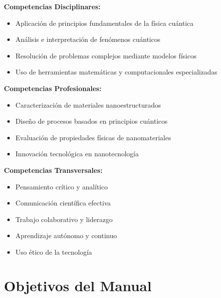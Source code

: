 \documentclass[12pt,a4paper]{book}
\begin{document}
	\begin{competenciabox}
		\textbf{Competencias Disciplinares:}
		\begin{itemize}
			\item Aplicación de principios fundamentales de la física cuántica
			\item Análisis e interpretación de fenómenos cuánticos
			\item Resolución de problemas complejos mediante modelos físicos
			\item Uso de herramientas matemáticas y computacionales especializadas
		\end{itemize}
		
		\textbf{Competencias Profesionales:}
		\begin{itemize}
			\item Caracterización de materiales nanoestructurados
			\item Diseño de procesos basados en principios cuánticos
			\item Evaluación de propiedades físicas de nanomateriales
			\item Innovación tecnológica en nanotecnología
		\end{itemize}
		
		\textbf{Competencias Transversales:}
		\begin{itemize}
			\item Pensamiento crítico y analítico
			\item Comunicación científica efectiva
			\item Trabajo colaborativo y liderazgo
			\item Aprendizaje autónomo y continuo
			\item Uso ético de la tecnología
		\end{itemize}
	\end{competenciabox}
	
	\section{Objetivos del Manual}
	
\end{document}
